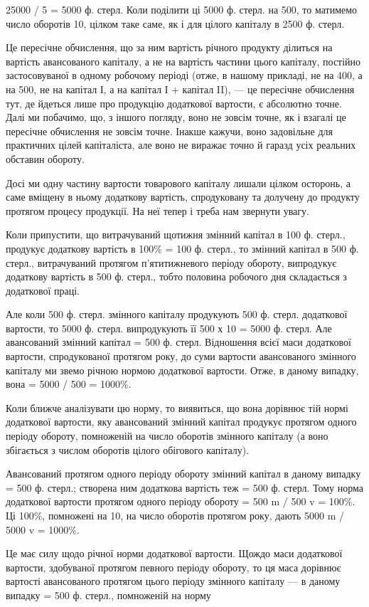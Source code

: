\parcont{}  %
25000 / 5 = 5000 ф. стерл. Коли поділити ці 5000 ф. стерл. на 500, то матимемо число оборотів 10,
цілком таке саме, як і для цілого капіталу в 2500 ф. стерл.

Це пересічне обчислення, що за ним вартість річного продукту ділиться на вартість авансованого
капіталу, а не на вартість частини цього капіталу, постійно застосовуваної в одному робочому періоді
(отже, в нашому прикладі, не на 400, а на 500, не на капітал І, а на капітал І + капітал II), — це
пересічне обчислення тут, де йдеться лише про продукцію додаткової вартости, є абсолютно точне. Далі
ми побачимо, що, з іншого погляду, воно не зовсім точне, як і взагалі це пересічне обчислення не
зовсім точне. Інакше кажучи, воно задовільне для практичних цілей капіталіста,
але воно не виражає точно й гаразд усіх реальних обставин обороту.

Досі ми одну частину вартости товарового капіталу лишали цілком осторонь, а саме вміщену в ньому
додаткову вартість, спродуковану та долучену до продукту протягом процесу продукції. На неї тепер і
треба нам звернути увагу.

Коли припустити, що витрачуваний щотижня змінний капітал в 100 ф. стерл., продукує додаткову
вартість в 100\% = 100 ф. стерл., то змінний капітал в 500 ф. стерл.,  витрачуваний протягом
п’ятитижневого періоду обороту, випродукує додаткову вартість в 500 ф. стерл., тобто половина
робочого дня складається з додаткової праці.

Але коли 500 ф. стерл. змінного капіталу продукують 500 ф. стерл. додаткової вартости, то 5000 ф.
стерл. випродукують її 500 х 10 = 5000 ф. стерл. Але авансований змінний капітал = 500 ф. стерл.
Відношення всієї маси додаткової вартости, спродукованої протягом року, до суми вартости
авансованого змінного капіталу ми звемо річною нормою додаткової вартости. Отже, в даному випадку,
вона = 5000 / 500 = 1000\%.

Коли ближче аналізувати цю норму, то виявиться, що вона дорівнює тій нормі додаткової вартости, яку
авансований змінний капітал продукує протягом одного періоду обороту, помноженій на число оборотів
змінного капіталу (а воно збігається з числом оборотів цілого обігового капіталу).

Авансований протягом одного періоду обороту змінний капітал в даному випадку = 500 ф. стерл.;
створена ним додаткова вартість теж = 500 ф. стерл. Тому норма додаткової вартости протягом одного
періоду обороту = 500 m / 500 v = 100\%. Ці 100\%, помножені на 10, на число оборотів протягом року,
дають 5000 m / 5000 v = 1000\%.

Це має силу щодо річної норми додаткової вартости. Щождо маси додаткової вартости, здобуваної
протягом певного періоду обороту, то ця маса дорівнює вартості авансованого протягом цього періоду
змінного капіталу — в даному випадку = 500 ф. стерл., помноженій на норму
\parbreak{}  %
